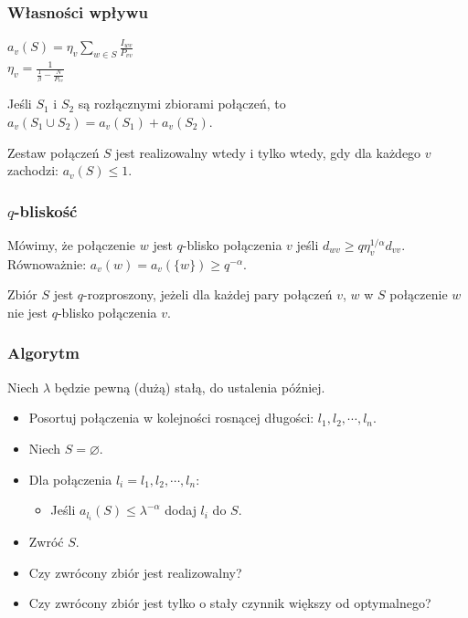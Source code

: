 \documentclass[polish, t,10pt]{beamer}
\begin{document}
\begin{frame}
    \frametitle{Własności wpływu}
    \begin{definition}
        $a_v(S) = \eta_v \sum_{w \in S} \frac{I_{wv}}{P_{vv}}$\\
        $\eta_v = \frac{1}{\frac{1}{\beta} - \frac{N}{P_{vv}}}$
    \end{definition}
    \begin{lemma}
        Jeśli $S_1$ i $S_2$ są rozłącznymi zbiorami połączeń, to $a_v(S_1 \cup S_2) = a_v(S_1) + a_v(S_2)$.
    \end{lemma}
    \begin{lemma}
        Zestaw połączeń $S$ jest realizowalny wtedy i tylko wtedy, gdy dla każdego $v$ zachodzi:
        $a_v(S) \le 1$.
    \end{lemma}
\end{frame}

\begin{frame}
    \frametitle{$q$-bliskość}
    \begin{definition}
        Mówimy, że połączenie $w$ jest $q$-blisko połączenia $v$ jeśli $d_{wv} \ge q \eta_v^{1/\alpha} d_{vv}$.
        Równoważnie: $a_v(w) = a_v(\{w\}) \ge q^{-\alpha}$.
    \end{definition}

    \begin{definition}
        Zbiór $S$ jest $q$-rozproszony, jeżeli dla każdej pary połączeń $v$, $w$ w $S$ połączenie $w$ nie jest $q$-blisko połączenia $v$.
    \end{definition}
\end{frame}

\begin{frame}
    \frametitle{Algorytm}
    Niech $\lambda$ będzie pewną (dużą) stałą, do ustalenia później.
    \begin{itemize}
        \item Posortuj połączenia w kolejności rosnącej długości: $l_1, l_2, \cdots, l_n$.
        \item Niech $S = \varnothing$.
        \item Dla połączenia $l_i = l_1, l_2, \cdots, l_n$:
        \begin{itemize}
            \item Jeśli $a_{l_i}(S) \le \lambda^{-\alpha}$ dodaj $l_i$ do $S$.
        \end{itemize}
        \item Zwróć $S$.
    \end{itemize}
    \pause
    \vfill
    \begin{itemize}
        \item Czy zwrócony zbiór jest realizowalny?
        \pause
        \item Czy zwrócony zbiór jest tylko o stały czynnik większy od optymalnego?
    \end{itemize}
\end{frame}
\end{document}
